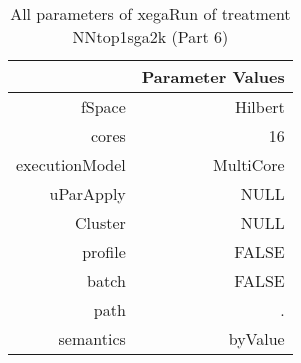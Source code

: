 \begin{table}[ht]
\centering
\begin{tabular}{rr}
  \hline
 & Parameter Values \\ 
  \hline
fSpace & Hilbert \\ 
  cores & 16 \\ 
  executionModel & MultiCore \\ 
  uParApply & NULL \\ 
  Cluster & NULL \\ 
  profile & FALSE \\ 
  batch & FALSE \\ 
  path & . \\ 
  semantics & byValue \\ 
   \hline
\end{tabular}
\caption{ All parameters of xegaRun of treatment NNtop1sga2k 
 (Part 6)} 
\end{table}
